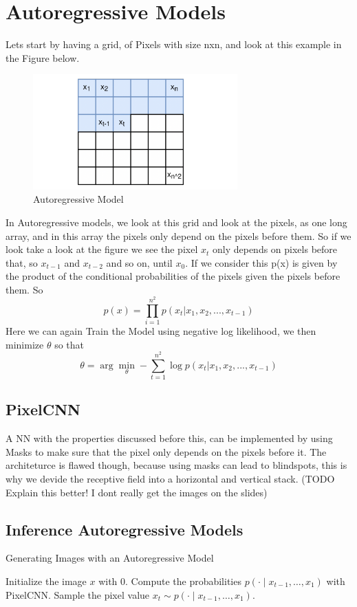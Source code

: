 \documentclass[a4paper]{article}
\begin{document}
\section{Autoregressive Models} 
Lets start by having a grid, of Pixels with size nxn, and look at this example in the Figure below.  
\begin{figure}
    \centering
    \includegraphics[width=0.7\textwidth]{images/autoregressive.png}
    \caption{Autoregressive Model}
    \label{fig:Autoregressive Model}
\end{figure}
In Autoregressive models, we look at this grid and look at the pixels, as one long array, and in this array the pixels only depend on the pixels before them. So if we look take a look at the figure we see the pixel $x_{t}$ only depends on pixels before that, so $x_{t-1}$ and $x_{t-2}$ and so on, until $x_{0}$. If we consider this p(x) 
is given by the product of the conditional probabilities of the pixels given the pixels before them. So $$p(x) = \prod_{i=1}^{n^2} p(x_{t}|x_{1}, x_{2}, ..., x_{t-1})$$ Here we can again Train the Model using negative log likelihood, we then minimize $\theta$ so that $$
\theta = \arg \min_{\theta} - \sum_{t = 1}^{n^2} \log p(x_{t}|x_{1}, x_{2}, ..., x_{t-1})$$
\subsection{PixelCNN}
A NN with the properties discussed before this, can be implemented by using Masks to make sure that the pixel only depends on the pixels before it. The architeturce is flawed though, because using masks can lead to blindspots, this is why we devide the receptive field into a horizontal and vertical stack. (TODO Explain this better! 
I dont really get the images on the slides)
\subsection{Inference Autoregressive Models}
\begin{algorithm}
    \caption{Generating Images with an Autoregressive Model}
    \begin{algorithmic}[1]
    \State Initialize the image $x$ with 0.
        \State Compute the probabilities $p(\cdot \mid x_{t-1}, \ldots, x_1)$ with PixelCNN.
        \State Sample the pixel value $x_t \sim p(\cdot \mid x_{t-1}, \ldots, x_1)$.
    \EndFor
    \end{algorithmic}
    \end{algorithm}
\end{document}
